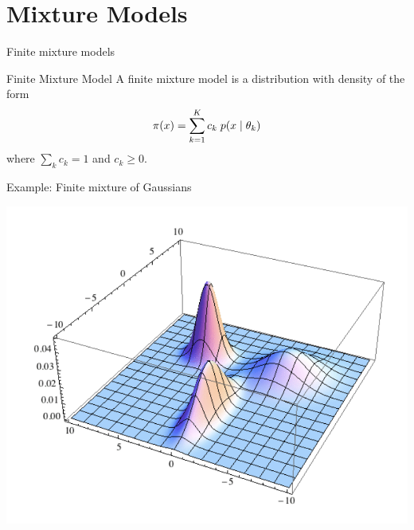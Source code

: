 \documentclass[10pt]{beamer}
\begin{document}
\section{Mixture Models} 

\begin{frame}{Finite mixture models}


\begin{sblock}{Finite Mixture Model}
A finite mixture model is a distribution with density of the form
\[ \pi(x) = \displaystyle\sum_{k=1}^K c_k \; p(x \; | \; \theta_k) \]
where $\sum_k c_k =1$ and $c_k \geq 0$.

\end{sblock}
\begin{sblock}{Example: Finite mixture of Gaussians}
\begin{center}
\includegraphics[width=.5\textwidth]{images/gmm}
\end{center}

\end{sblock}

\end{frame}

\end{document}
